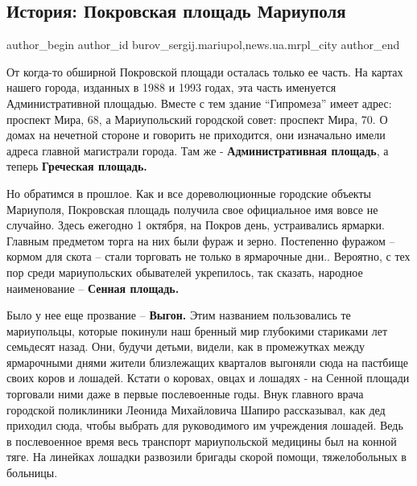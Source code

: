  
 
 
 
 
 
\subsection{История: Покровская площадь Мариуполя}
\label{sec:27_10_2018.stz.news.ua.mrpl_city.1.istoria_pokrovskaja_ploschad_mariupolja}
 
\ifcmt
 author_begin
   author_id burov_sergij.mariupol,news.ua.mrpl_city
 author_end
\fi


От когда-то обширной Покровской площади осталась только ее часть. На картах
нашего города, изданных в 1988 и 1993 годах, эта часть именуется
Административной площадью. Вместе с тем здание \enquote{Гипромеза} имеет адрес:
проспект Мира, 68, а Мариупольский городской совет: проспект Мира, 70. О домах
на нечетной стороне и говорить не приходится, они изначально имели адреса
главной магистрали города. Там же - \textbf{Административная площадь}, а теперь
\textbf{Греческая площадь.}

Но обратимся в прошлое. Как и все дореволюционные городские объекты Мариуполя,
Покровская площадь получила свое официальное имя вовсе не случайно. Здесь
ежегодно 1 октября, на Покров день, устраивались ярмарки. Главным предметом
торга на них были фураж и зерно. Постепенно фуражом – кормом для скота – стали
торговать не только в ярмарочные дни.. Вероятно, с тех пор среди мариупольских
обывателей укрепилось, так сказать, народное наименование – \textbf{Сенная площадь.} 

Было у нее еще прозвание – \textbf{Выгон.} Этим названием пользовались те мариупольцы,
которые покинули наш бренный  мир глубокими стариками лет семьдесят назад. Они,
будучи детьми, видели, как в промежутках между ярмарочными днями жители
близлежащих кварталов выгоняли сюда на пастбище своих коров и лошадей. Кстати о
коровах, овцах и лошадях - на Сенной площади торговали ними даже в первые
послевоенные годы. Внук главного врача городской поликлиники Леонида
Михайловича Шапиро рассказывал, как дед приходил сюда, чтобы выбрать для
руководимого им учреждения лошадей. Ведь в послевоенное время весь транспорт
мариупольской медицины был на конной тяге. На линейках лошадки развозили
бригады скорой помощи, тяжелобольных в больницы.

